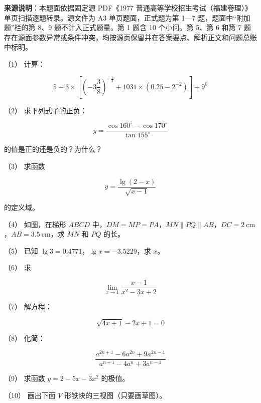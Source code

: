 


\begin{gktip}
\textbf{来源说明}：本题面依据固定源 PDF《1977 普通高等学校招生考试（福建卷理）》单页扫描逐题转录。源文件为 A3 单页题面，正式题为第 1—7 题，题面中“附加题”栏的第 8、9 题不计入正式题量。第 1 题含 10 个小问。第 5、第 6 和第 7 题存在源面参数异常或条件冲突，均按源页保留并在答案要点、解析正文和问题总账中标明。
\end{gktip}

\Needspace{0.4\textheight}
\begin{question}

（1） 计算：

\nopagebreak[4]
\[
5-3\times\left[\left(-3\frac38\right)^{-\frac13}+1031\times\left(0.25-2^{-2}\right)\right]\div9^0
\]

（2） 求下列式子的正负：

\nopagebreak[4]
\[
y=\frac{\cos160^\circ-\cos170^\circ}{\tan155^\circ}
\]

的值是正的还是负的？为什么？

（3） 求函数

\nopagebreak[4]
\[
y=\frac{\lg(2-x)}{\sqrt{x-1}}
\]

的定义域。

（4） 如图，在梯形 $ABCD$ 中，$DM=MP=PA$，$MN\parallel PQ\parallel AB$，$DC=2\ \mathrm{cm}$，$AB=3.5\ \mathrm{cm}$，求 $MN$ 和 $PQ$ 的长。
\nopagebreak[4]
\begin{center}\end{center}
\nopagebreak[4]
（5） 已知 $\lg3=0.4771$，$\lg x=-3.5229$，求 $x$。

（6） 求

\nopagebreak[4]
\[
\lim_{x\to1}\frac{x-1}{x^2-3x+2}
\]

（7） 解方程：

\nopagebreak[4]
\[
\sqrt{4x+1}-2x+1=0
\]

（8） 化简：

\nopagebreak[4]
\[
\frac{a^{2n+1}-6a^{2n}+9a^{2n-1}}{a^{n+1}-4a^n+3a^{n-1}}
\]

（9） 求函数 $y=2-5x-3x^2$ 的极值。

（10） 画出下面 $V$ 形铁块的三视图（只要画草图）。
\nopagebreak[4]
\begin{center}\end{center}
\nopagebreak[4]
\end{question}
